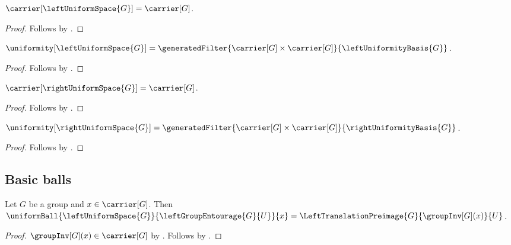 \begin{proposition}\label{left_uniform_space_carrier}
    $\carrier[\leftUniformSpace{G}]=\carrier[G]$.
\end{proposition}
\begin{proof}
    Follows by
        .
\end{proof}

\begin{proposition}\label{left_uniform_space_uniformity}
    $\uniformity[\leftUniformSpace{G}]
        =\generatedFilter
            {\carrier[G]\times\carrier[G]}{\leftUniformityBasis{G}}$.
\end{proposition}
\begin{proof}
    Follows by
        .
\end{proof}

\begin{proposition}\label{right_uniform_space_carrier}
    $\carrier[\rightUniformSpace{G}]=\carrier[G]$.
\end{proposition}
\begin{proof}
    Follows by
        .
\end{proof}

\begin{proposition}\label{right_uniform_space_uniformity}
    $\uniformity[\rightUniformSpace{G}]
        =\generatedFilter
            {\carrier[G]\times\carrier[G]}{\rightUniformityBasis{G}}$.
\end{proposition}
\begin{proof}
    Follows by
        .
\end{proof}

\subsection{Basic balls}

\begin{proposition}\label{left_group_entourage_ball}
    Let $G$ be a group and $x\in\carrier[G]$.
    Then $\uniformBall{\leftUniformSpace{G}}
        {\leftGroupEntourage{G}{U}}{x}
        =\LeftTranslationPreimage{G}{\groupInv[G](x)}{U}$.
\end{proposition}
\begin{proof}
    $\groupInv[G](x)\in\carrier[G]$ by .
    Follows by
        .
\end{proof}

